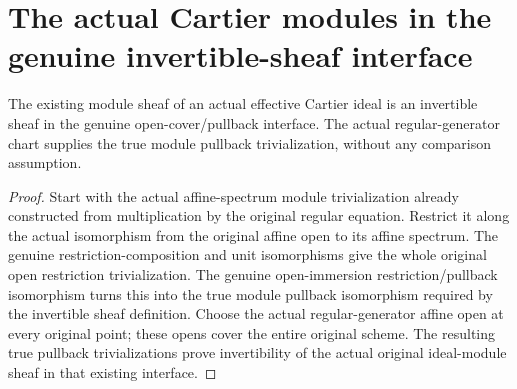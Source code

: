 \section{The actual Cartier modules in the genuine invertible-sheaf interface}

\begin{lemma}
\label{lem:cartier-actual-invertible-module-sheaf}
\leanok
{}
The existing module sheaf of an actual effective Cartier ideal is an
invertible sheaf in the genuine open-cover/pullback interface.  The
actual regular-generator chart supplies the true module pullback
trivialization, without any comparison assumption.
\end{lemma}
\begin{proof}
Start with the actual affine-spectrum module trivialization already
constructed from multiplication by the original regular equation.
Restrict it along the actual isomorphism from the original affine open
to its affine spectrum.  The genuine restriction-composition and unit
isomorphisms give the whole original open restriction trivialization.
The genuine open-immersion restriction/pullback isomorphism turns this
into the true module pullback isomorphism required by the invertible
sheaf definition.  Choose the actual regular-generator affine open at
every original point; these opens cover the entire original scheme.
The resulting true pullback trivializations prove invertibility of the
actual original ideal-module sheaf in that existing interface.
\end{proof}
